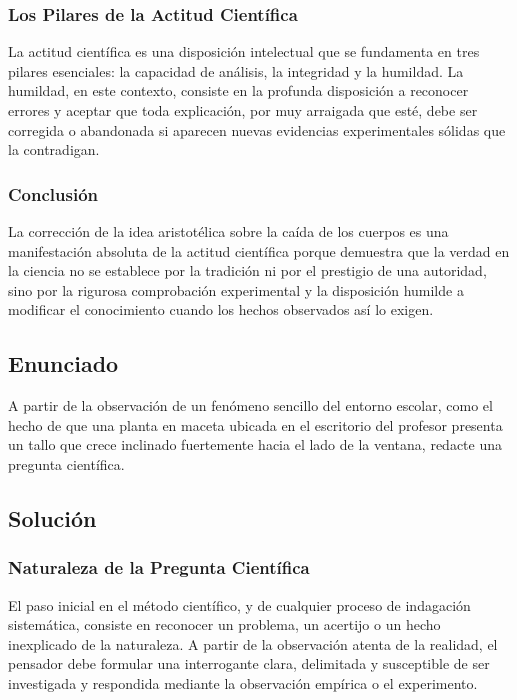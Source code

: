 \documentclass[12pt, a4paper]{article}
\begin{document}
\subsubsection*{Los Pilares de la Actitud Científica}
La actitud científica es una disposición intelectual que se fundamenta en tres pilares esenciales: la capacidad de análisis, la integridad y la humildad. La humildad, en este contexto, consiste en la profunda disposición a reconocer errores y aceptar que toda explicación, por muy arraigada que esté, debe ser corregida o abandonada si aparecen nuevas evidencias experimentales sólidas que la contradigan.

\subsubsection*{Conclusión}
La corrección de la idea aristotélica sobre la caída de los cuerpos es una manifestación absoluta de la actitud científica porque demuestra que la verdad en la ciencia no se establece por la tradición ni por el prestigio de una autoridad, sino por la rigurosa comprobación experimental y la disposición humilde a modificar el conocimiento cuando los hechos observados así lo exigen.

\newpage

\subsection*{Enunciado}
A partir de la observación de un fenómeno sencillo del entorno escolar, como el hecho de que una planta en maceta ubicada en el escritorio del profesor presenta un tallo que crece inclinado fuertemente hacia el lado de la ventana, redacte una pregunta científica.

\subsection*{Solución}

\subsubsection*{Naturaleza de la Pregunta Científica}
El paso inicial en el método científico, y de cualquier proceso de indagación sistemática, consiste en reconocer un problema, un acertijo o un hecho inexplicado de la naturaleza. A partir de la observación atenta de la realidad, el pensador debe formular una interrogante clara, delimitada y susceptible de ser investigada y respondida mediante la observación empírica o el experimento.
\end{document}
